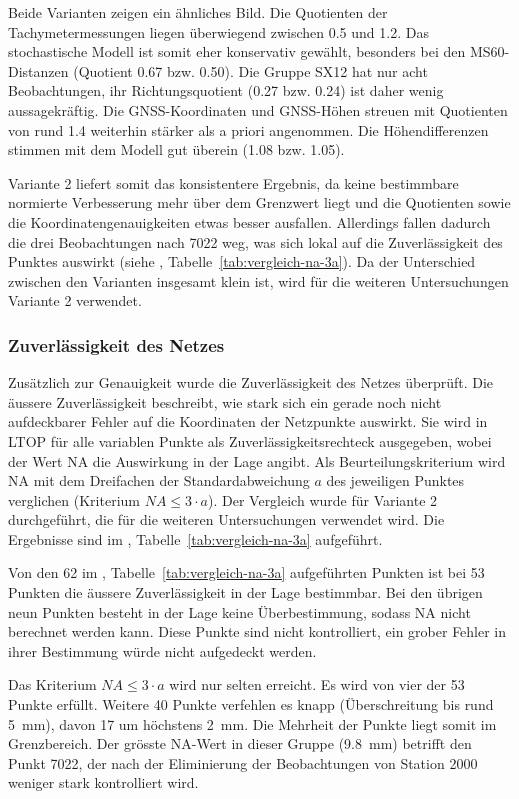 Beide Varianten zeigen ein ähnliches Bild. Die Quotienten der Tachymetermessungen liegen
überwiegend zwischen 0.5 und 1.2. Das stochastische Modell ist somit eher konservativ gewählt,
besonders bei den MS60-Distanzen (Quotient 0.67 bzw. 0.50). Die Gruppe SX12 hat nur acht
Beobachtungen, ihr Richtungsquotient (0.27 bzw. 0.24) ist daher wenig aussagekräftig. Die
GNSS-Koordinaten und GNSS-Höhen streuen mit Quotienten von rund 1.4 weiterhin stärker als a priori
angenommen. Die Höhendifferenzen stimmen mit dem Modell gut überein (1.08 bzw. 1.05).

Variante 2 liefert somit das konsistentere Ergebnis, da keine bestimmbare normierte Verbesserung
mehr über dem Grenzwert liegt und die Quotienten sowie die Koordinatengenauigkeiten etwas besser
ausfallen. Allerdings fallen dadurch die drei Beobachtungen nach 7022 weg, was sich lokal auf die
Zuverlässigkeit des Punktes auswirkt (siehe , Tabelle~\ref{tab:vergleich-na-3a}). Da der
Unterschied zwischen den Varianten insgesamt klein ist, wird für die weiteren Untersuchungen
Variante 2 verwendet.

\subsubsection{Zuverlässigkeit des Netzes}
\label{sec:zuverlaessigkeit}

Zusätzlich zur Genauigkeit wurde die Zuverlässigkeit des Netzes überprüft. Die äussere Zuverlässigkeit
beschreibt, wie stark sich ein gerade noch nicht aufdeckbarer Fehler auf die Koordinaten der
Netzpunkte auswirkt. Sie wird in LTOP für alle variablen Punkte als Zuverlässigkeitsrechteck
ausgegeben, wobei der Wert NA die Auswirkung in der Lage angibt. Als Beurteilungskriterium wird NA
mit dem Dreifachen der Standardabweichung $a$ des jeweiligen Punktes verglichen
(Kriterium $NA \le 3\cdot a$). Der Vergleich wurde für Variante 2 durchgeführt, die für die
weiteren Untersuchungen verwendet wird. Die Ergebnisse sind im , Tabelle~\ref{tab:vergleich-na-3a} aufgeführt. \bigskip

Von den 62 im , Tabelle~\ref{tab:vergleich-na-3a} aufgeführten Punkten ist bei 53 Punkten die äussere
Zuverlässigkeit in der Lage bestimmbar. Bei den übrigen neun Punkten besteht in der Lage keine
Überbestimmung, sodass NA nicht berechnet werden kann. Diese Punkte sind nicht kontrolliert, ein
grober Fehler in ihrer Bestimmung würde nicht aufgedeckt werden. \bigskip

Das Kriterium $NA \le 3\cdot a$ wird nur selten erreicht. Es wird von vier der 53 Punkte erfüllt.
Weitere 40 Punkte verfehlen es knapp (Überschreitung bis rund 5~mm), davon 17 um höchstens 2~mm.
Die Mehrheit der Punkte liegt somit im Grenzbereich. Der grösste NA-Wert in dieser Gruppe (9.8~mm)
betrifft den Punkt 7022, der nach der Eliminierung der Beobachtungen von Station 2000 weniger stark
kontrolliert wird. \bigskip

